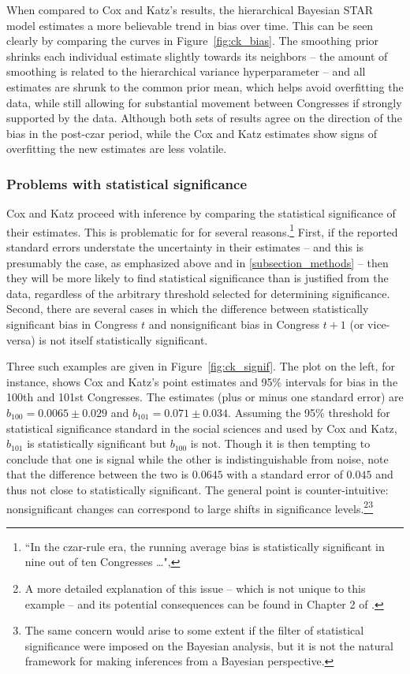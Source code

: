 When compared to Cox and Katz's results, the hierarchical Bayesian STAR model estimates 
a more believable trend in bias over time. This can be seen clearly by comparing the curves 
in Figure~\ref{fig:ck_bias}. The smoothing prior shrinks each individual estimate slightly 
towards its neighbors -- the amount of smoothing is related to the hierarchical variance 
hyperparameter -- and all estimates are shrunk to the common prior mean, which helps 
avoid overfitting the data, while still allowing for substantial movement between Congresses 
if strongly supported by the data. Although both sets of results agree on the direction of the 
bias in the post-czar period, while the Cox and Katz estimates show signs of overfitting 
the new estimates are less volatile. 


\subsubsection{Problems with statistical significance}

Cox and Katz proceed with inference by comparing the statistical significance of their 
estimates. This is problematic for for several reasons.\footnote{``In the czar-rule era, 
the running average bias is statistically significant in nine out of ten Congresses \dots", } 
First, if the reported standard errors understate the uncertainty in their estimates 
-- and this is presumably the case, as emphasized above and in \ref{subsection_methods} 
-- then they will be more likely to find statistical significance than is justified from the data, 
regardless of the arbitrary threshold selected for determining significance. Second, there
are several cases in which the difference between statistically significant 
bias in Congress $t$ and nonsignificant bias in Congress $t + 1$ (or vice-versa) is not itself 
statistically significant. 

Three such examples are given in Figure~\ref{fig:ck_signif}. The plot on the left, for instance, 
shows Cox and Katz's point estimates and 95\% intervals for bias in the 100th and 101st 
Congresses. The estimates (plus or minus one standard error) are $b_{100} = 0.0065 \pm 0.029$ 
and $b_{101} = 0.071 \pm 0.034$. Assuming the 95\% threshold for statistical significance 
standard in the social sciences and used by Cox and Katz, $b_{101}$ is statistically significant 
but $b_{100}$ is not. Though it is then tempting to conclude that one is signal while the other 
is indistinguishable from noise, note that the difference between the two is 
$0.0645$ with a standard error of $0.045$ and thus not close to statistically significant. 
The general point is counter-intuitive: nonsignificant changes can correspond to large shifts 
in significance levels.\footnote{A more detailed explanation of this issue -- which is not unique to this 
example -- and its potential consequences can be found in Chapter 2 of 
.}\footnote{The same concern would arise to some extent if the filter 
of statistical significance were imposed on the Bayesian analysis, but it is not the natural framework 
for making inferences from a Bayesian perspective.} 

